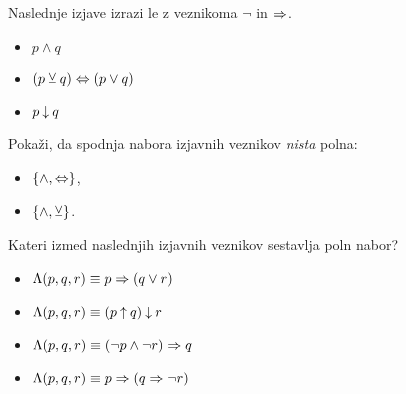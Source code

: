 \begin{vaja}
 Naslednje izjave izrazi le z veznikoma $\lnot$ in $\Rightarrow$.
\begin{itemize}
  \item $p\land q$
  \item $(p\mathbin{\veebar} q)\Leftrightarrow (p\lor q)$
  \item $p\mathbin{\downarrow} q$
\end{itemize}
\end{vaja}

\begin{vaja}
Pokaži, da spodnja nabora izjavnih veznikov {\em nista} polna:
\begin{itemize}
 \item  $\set{\land, \lequ }$,
 \item  $\set{ \land, \xor }$.
\end{itemize}
\end{vaja}


\begin{vaja}
Kateri izmed naslednjih izjavnih veznikov sestavlja poln nabor?
\begin{itemize}
 \item $\Lambda(p,q,r) \equiv p \Rightarrow (q \lor r)$
 \item $\Lambda(p,q,r) \equiv (p \mathbin{\uparrow} q) \mathbin{\downarrow} r$
 \item $\Lambda(p,q,r) \equiv (\lnot p \land \lnot r) \Rightarrow q$
 \item $\Lambda(p,q,r) \equiv p \Rightarrow (q \Rightarrow \lnot r)$
\end{itemize}
\end{vaja}


